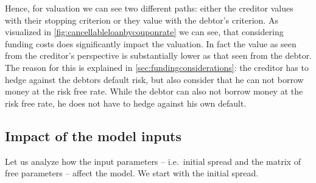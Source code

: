 \documentclass[12pt]{article}
\begin{document}
	Hence, for valuation we can see two different paths: either the creditor values with their stopping criterion or they value with the debtor's criterion. 
	As visualized in \cref{fig:cancellableloanbycouponrate} we can see, that considering funding costs does significantly impact the valuation. In fact the value as seen from the creditor's perspective is substantially lower as that seen from the debtor. The reason for this is explained in \cref{sec:fundingconsiderations}: the creditor has to hedge against the debtors default risk, but also consider that he can not borrow money at the risk free rate. While the debtor can also not borrow money at the risk free rate, he does not have to hedge against his own default.
	
	\subsection{Impact of the model inputs}
	Let us analyze how the input parameters -- i.e.\ initial spread and the matrix of free parameters -- affect the model. We start with the initial spread.
\end{document}
